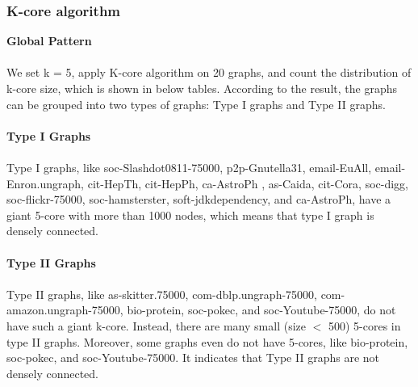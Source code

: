 
\subsubsection{K-core algorithm}
\textbf{Global Pattern}
\\
\\
We set k = 5, apply K-core algorithm on 20 graphs, and count the distribution of k-core size, which is shown in below tables. According to the result, the graphs can be grouped into two types of graphs: Type I graphs and Type II graphs.
\\
\\
\textbf{Type I Graphs}
\\
\\
Type I graphs, like soc-Slashdot0811-75000, p2p-Gnutella31, email-EuAll, email-Enron.ungraph, cit-HepTh, cit-HepPh, ca-AstroPh , as-Caida, cit-Cora, soc-digg, soc-flickr-75000, soc-hamsterster, soft-jdkdependency, and ca-AstroPh, have a giant 5-core with more than 1000 nodes, which means that type I graph is densely connected. 
\\
\\
\textbf{Type II Graphs}
\\
\\
Type II graphs, like as-skitter.75000, com-dblp.ungraph-75000, com-amazon.ungraph-75000, bio-protein, soc-pokec, and soc-Youtube-75000, do not have such a giant k-core. Instead, there are many small (size $<$ 500) 5-cores in type II graphs. Moreover, some graphs even do not have 5-cores, like bio-protein, soc-pokec, and soc-Youtube-75000. It indicates that Type II graphs are not densely connected.
\\

